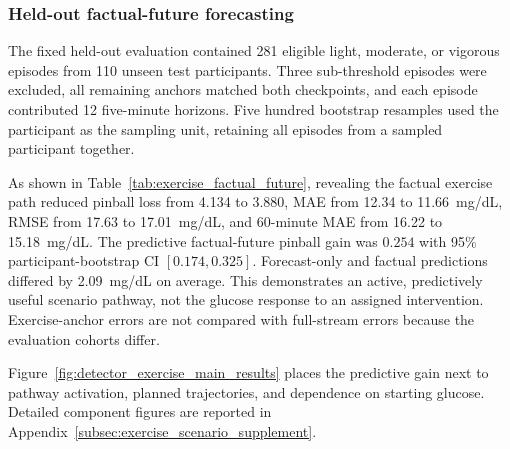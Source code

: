 \subsubsection{Held-out factual-future forecasting}

The fixed held-out evaluation contained 281 eligible light, moderate, or
vigorous episodes from 110 unseen test participants. Three sub-threshold
episodes were excluded, all remaining anchors matched both checkpoints, and
each episode contributed 12 five-minute horizons. Five hundred bootstrap
resamples used the participant as the sampling unit, retaining all episodes
from a sampled participant together.

As shown in Table~\ref{tab:exercise_factual_future}, revealing the factual
exercise path reduced pinball loss from 4.134 to 3.880, MAE from 12.34 to
11.66~mg/dL, RMSE from 17.63 to 17.01~mg/dL, and 60-minute MAE from 16.22 to
15.18~mg/dL. The predictive factual-future pinball gain was $0.254$ with 95\%
participant-bootstrap CI $[0.174,0.325]$. Forecast-only and factual predictions
differed by 2.09~mg/dL on average. This demonstrates an active, predictively
useful scenario pathway, not the glucose response to an assigned intervention.
Exercise-anchor errors are not compared with full-stream errors because the
evaluation cohorts differ.

\begin{table}[H]
  \centering
  \caption{%
    \textbf{Held-out factual-future forecasting.}
    Intervals are participant-bootstrap 95\% CIs. The gain row is forecast
    only minus factual future, so positive values indicate improvement.%
  }
  \label{tab:exercise_factual_future}
  \scriptsize
\end{table}

Figure~\ref{fig:detector_exercise_main_results} places the predictive gain next
to pathway activation, planned trajectories, and dependence on starting
glucose. Detailed component figures are reported in
Appendix~\ref{subsec:exercise_scenario_supplement}.

